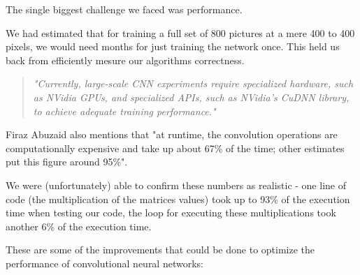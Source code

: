 The single biggest challenge we faced was performance.

We had estimated that for training a full set of 800 pictures at a mere 400 to 400 pixels, we would need months for just training the network once. This held us back from efficiently mesure our algorithms correctness.

\begin{quote}
	\emph{"Currently, large-scale CNN experiments require specialized hardware, such as NVidia GPUs,
		and specialized APIs, such as NVidia’s CuDNN library, to
		achieve  adequate  training  performance."} \cite{Abuzaid2015} 
\end{quote}

Firaz Abuzaid also mentions that "at runtime,  the convolution operations are computationally expensive and take up about 67\% of the time; other estimates put this figure around 95\%".

We were (unfortunately) able to confirm these numbers as realistic - one line of code (the multiplication of the matrices values) took up to 93\% of the execution time when testing our code, the loop for executing these multiplications took another 6\% of the execution time. 

These are some of the improvements that could be done to optimize the performance of convolutional neural networks:

